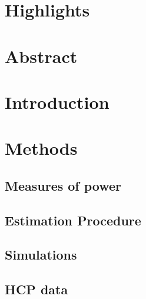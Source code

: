 





\section*{Highlights}



 \section{Abstract}



 \section{Introduction}



 \section{Methods}

\subsection{Measures of power \label{ss.power}}


\subsection{Estimation Procedure \label{ss.est}}


\subsection{Simulations}


\subsection{HCP data}


